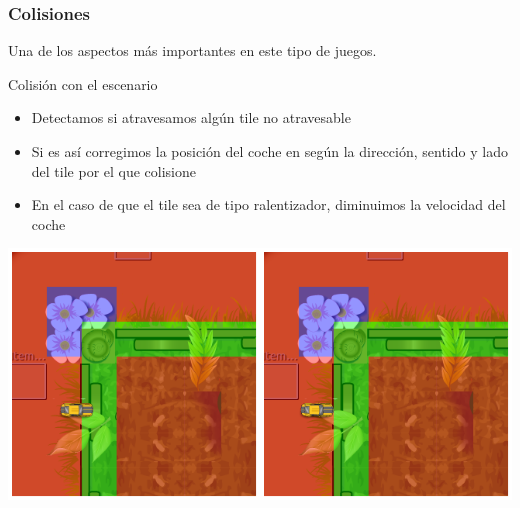 \begin{frame}
    \frametitle{Colisiones}
    
    Una de los aspectos más importantes en este tipo de juegos.
    \begin{block}{Colisión con el escenario}
        \begin{itemize}
            \item Detectamos si atravesamos algún tile no atravesable
            \item Si es así corregimos la posición del coche en según la dirección, sentido y lado del tile por
            el que colisione
            \item En el caso de que el tile sea de tipo ralentizador, diminuimos la velocidad del coche
        \end{itemize}
    \end{block}

    \begin{center}
        \includegraphics[scale=0.3]{imagenes/colision1-colision2.png}
    \end{center}
\end{frame}

